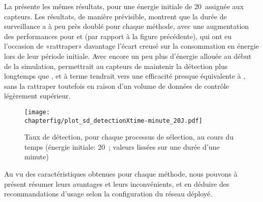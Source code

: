 La  présente les mêmes résultats, pour une énergie initiale de 20~\joule assignée aux capteurs.
Les résultats, de manière prévisible, montrent que la durée de surveillance a à peu près doublé pour chaque méthode, avec une augmentation des performances pour \iddemx et \iddems (par rapport à la figure précédente), qui ont eu l'occasion de «rattraper» davantage l'écart creusé sur la consommation en énergie lors de leur période initiale.
Avec encore un peu plus d'énergie allouée au début de la simulation, \iddemx permettrait au capteurs de maintenir la détection plus longtemps que \ideres, et à terme tendrait vers une efficacité presque équivalente à \idrand, sans la rattraper toutefois en raison d'un volume de données de contrôle légèrement supérieur.
\begin{figure}[p]
    \centering
    \texttt{[image: \\chapterfig/plot\_sd\_detectionXtime-minute\_20J.pdf]}
    \caption[Taux de détection au cours du temps (énergie initiale: 20~\joule)]{Taux de détection, pour chaque processus de sélection, au cours du temps (énergie initiale: 20~\joule; valeurs lissées sur une durée d'une minute)}\label{sd:fig:detec-min-20J}
\end{figure}

Au vu des caractéristiques obtenues pour chaque méthode, nous pouvons à présent résumer leurs avantages et leurs inconvénients, et en déduire des recommandations d'usage selon la configuration du réseau déployé.
\pagebreak %
